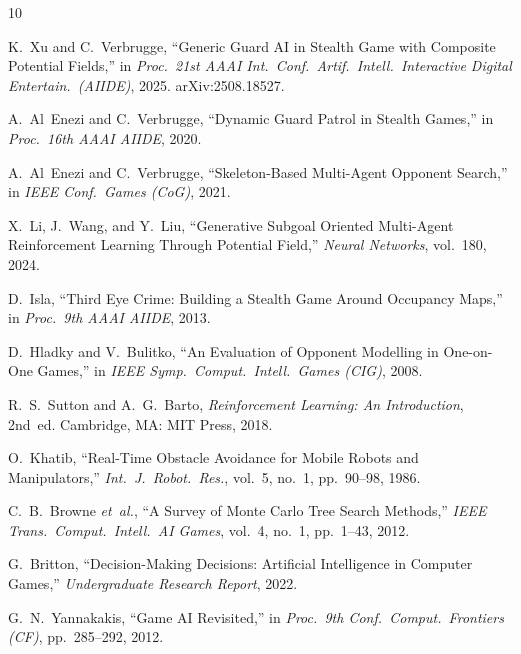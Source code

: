 \documentclass[conference,onecolumn]{IEEEtran}
\begin{document}
\begin{thebibliography}{10}

K.~Xu and C.~Verbrugge,
``Generic Guard AI in Stealth Game with Composite Potential Fields,''
in \emph{Proc.\ 21st AAAI Int.\ Conf.\ Artif.\ Intell.\ Interactive
Digital Entertain.\ (AIIDE)}, 2025. arXiv:2508.18527.

A.~Al~Enezi and C.~Verbrugge,
``Dynamic Guard Patrol in Stealth Games,''
in \emph{Proc.\ 16th AAAI AIIDE}, 2020.

A.~Al~Enezi and C.~Verbrugge,
``Skeleton-Based Multi-Agent Opponent Search,''
in \emph{IEEE Conf.\ Games (CoG)}, 2021.

X.~Li, J.~Wang, and Y.~Liu,
``Generative Subgoal Oriented Multi-Agent Reinforcement Learning
Through Potential Field,''
\emph{Neural Networks}, vol.~180, 2024.

D.~Isla,
``Third Eye Crime: Building a Stealth Game Around Occupancy Maps,''
in \emph{Proc.\ 9th AAAI AIIDE}, 2013.

D.~Hladky and V.~Bulitko,
``An Evaluation of Opponent Modelling in One-on-One Games,''
in \emph{IEEE Symp.\ Comput.\ Intell.\ Games (CIG)}, 2008.

R.~S.~Sutton and A.~G.~Barto,
\emph{Reinforcement Learning: An Introduction}, 2nd~ed.
Cambridge, MA: MIT Press, 2018.

O.~Khatib,
``Real-Time Obstacle Avoidance for Mobile Robots and Manipulators,''
\emph{Int.\ J.\ Robot.\ Res.}, vol.~5, no.~1, pp.~90--98, 1986.

C.~B.~Browne \emph{et~al.},
``A Survey of Monte Carlo Tree Search Methods,''
\emph{IEEE Trans.\ Comput.\ Intell.\ AI Games}, vol.~4, no.~1,
pp.~1--43, 2012.

G.~Britton,
``Decision-Making Decisions: Artificial Intelligence in Computer
Games,''
\emph{Undergraduate Research Report}, 2022.

G.~N.~Yannakakis,
``Game AI Revisited,''
in \emph{Proc.\ 9th Conf.\ Comput.\ Frontiers (CF)},
pp.~285--292, 2012.

\end{thebibliography}
\end{document}
